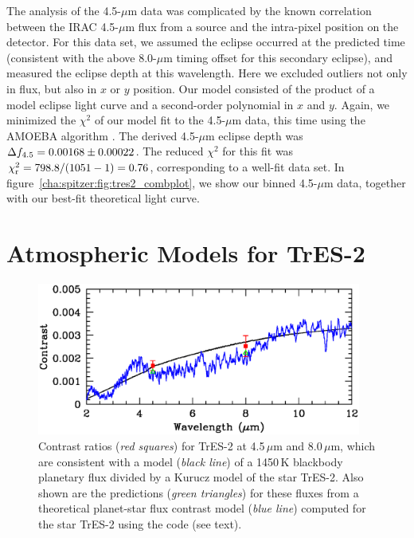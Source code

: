 The analysis of the 4.5-$\mu$m data was complicated by the known correlation between the IRAC 4.5-$\mu$m flux from a source and the intra-pixel position on the detector.
For this data set, we assumed the eclipse occurred at the predicted time (consistent with the above 8.0-$\mu$m timing offset for this secondary eclipse), and measured the eclipse depth at this wavelength.
Here we excluded outliers not only in flux, but also in $x$ or $y$ position.
Our model consisted of the product of a model eclipse light curve
and a second-order polynomial in $x$ and $y$.
Again, we minimized the $\chi^{2}$ of our model fit to the 4.5-$\mu$m data, this time using the AMOEBA algorithm \citep{Press_Teukolsky_Vetterling:1992a}.
The derived 4.5-$\mu$m eclipse depth was \mbox{$\Delta f_{\rm {4.5}} = 0.00168 \pm 0.00022$}.
The reduced $\chi^{2}$ for this fit was \mbox{$\chi_{\rm r}^{2} = 798.8/(1051-1)=0.76$}, corresponding to a well-fit data set.
In figure~\ref{cha:spitzer:fig:tres2_combplot}, we show our binned 4.5-$\mu$m data, together with our best-fit theoretical light curve.

\section{Atmospheric Models for TrES-2}
\label{cha:spitzer:sec:atm}

\begin{figure}
\begin{center}
\includegraphics[width=0.95\textwidth]{6_f2}
\caption[%
Near-infrared contrast ratios for TrES-2]{%
Contrast ratios ({\it red squares}) for TrES-2 at 4.5\,$\mu$m and 8.0\,$\mu$m, which are consistent with a model ({\it black line}) of a 1450\,K blackbody planetary flux divided by a Kurucz model of the star TrES-2. Also shown are the predictions ({\it green triangles}) for these fluxes from a theoretical planet-star flux contrast model ({\it blue line}) computed for the star TrES-2 using the \citet{Seager_Richardson_Hansen:apj:2005a} code (see text).%
}
\label{cha:spitzer:fig:tres2models}
\end{center}
\end{figure}

